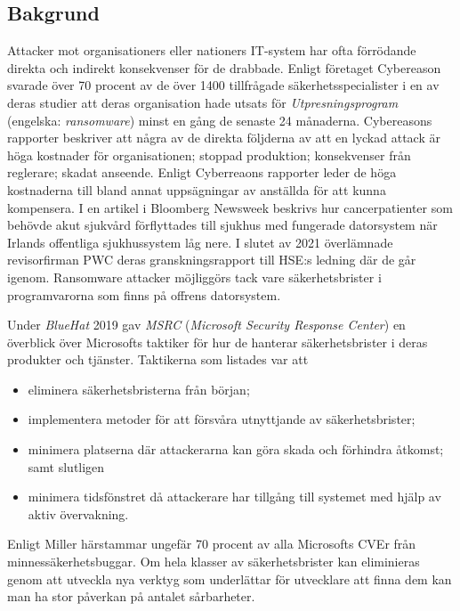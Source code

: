 \subsection{Bakgrund}

Attacker mot organisationers eller nationers IT-system har ofta förrödande direkta och indirekt
konsekvenser för de drabbade. Enligt företaget Cybereason svarade över 70 procent av de över 1400
tillfrågade säkerhetsspecialister i en av deras studier att deras organisation hade utsats för
\emph{Utpresningsprogram} (engelska: \emph{ransomware}) minst en gång de senaste 24 månaderna.
\cite{cyberreason2021}\cite{cyberreason2022} Cybereasons rapporter beskriver att några av de
direkta följderna av att en lyckad attack är höga kostnader för organisationen; stoppad produktion;
konsekvenser från reglerare; skadat anseende. Enligt Cyberreaons rapporter leder de höga kostnaderna
till bland annat uppsägningar av anställda för att kunna kompensera. I en artikel i Bloomberg
Newsweek beskrivs hur cancerpatienter som behövde akut sjukvård förflyttades till sjukhus med
fungerade datorsystem när Irlands offentliga sjukhussystem låg nere.\cite{gallagher2023} I slutet
av 2021 överlämnade revisorfirman PWC deras granskningsrapport till HSE:s ledning där de går igenom.
\cite{hse_report} Ransomware attacker möjliggörs tack vare säkerhetsbrister i programvarorna som
finns på offrens datorsystem.

Under \emph{BlueHat} 2019 gav \emph{MSRC} (\emph{Microsoft Security Response Center}) en överblick
över Microsofts taktiker för hur de hanterar säkerhetsbrister i deras produkter och tjänster.
\cite{miller19} Taktikerna som listades var att
\begin{itemize}
	\item eliminera säkerhetsbristerna från början;
	\item implementera metoder för att försvåra utnyttjande av säkerhetsbrister;
	\item minimera platserna där attackerarna kan göra skada och förhindra åtkomst; samt slutligen
	\item minimera tidsfönstret då attackerare har tillgång till systemet med hjälp av aktiv övervakning.
\end{itemize}
Enligt Miller härstammar ungefär 70 procent av alla Microsofts CVEr från minnessäkerhetsbuggar. Om
hela klasser av säkerhetsbrister kan eliminieras genom att utveckla nya verktyg som underlättar för
utvecklare att finna dem kan man ha stor påverkan på antalet sårbarheter.

